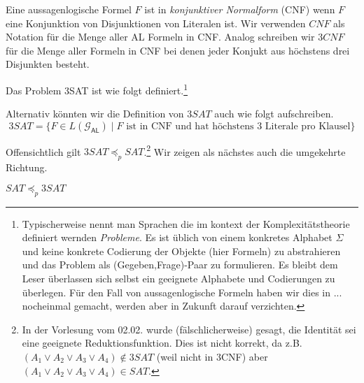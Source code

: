 Eine aussagenlogische Formel $F$ ist in \emph{konjunktiver Normalform} (CNF) wenn $F$ eine Konjunktion von Disjunktionen von Literalen ist.
Wir verwenden $CNF$ als Notation für die Menge aller AL Formeln in CNF.
Analog schreiben wir $3CNF$ für die Menge aller Formeln in CNF bei denen jeder Konjukt aus höchstens drei Disjunkten besteht.



\begin{Def}[name={[$3SAT$]}]
Das Problem 3SAT ist wie folgt definiert.\footnote{
Typischerweise nennt man Sprachen die im kontext der Komplexitätstheorie definiert wernden \emph{Probleme}.
Es ist üblich von einem konkretes Alphabet $\Sigma$ und keine konkrete Codierung der Objekte (hier Formeln) zu abstrahieren und das Problem als (Gegeben,Frage)-Paar zu formulieren.
Es bleibt dem Leser überlassen sich selbst ein geeignete Alphabete und Codierungen zu überlegen.
Für den Fall von aussagenlogische Formeln haben wir dies in ... nocheinmal gemacht, werden aber in Zukunft darauf verzichten. }
\begin{center}
\end{center}
	
\end{Def}
Alternativ könnten wir die Definition von $3SAT$ auch wie folgt aufschreiben.
$$3SAT = \{F\in L(\mathcal{G}_\mathsf{AL})\mid F \text{ ist in CNF und hat höchstens 3 Literale pro Klausel}\}$$

Offensichtlich gilt $3SAT \preceq_p SAT$.\footnote{
In der Vorlesung vom 02.02. wurde (fälschlicherweise) gesagt, die Identität sei eine geeignete Reduktionsfunktion.
Dies ist nicht korrekt, da z.B. 
$(A_1\lor A_2\lor A_3\lor A_4)\notin 3SAT$
(weil nicht in 3CNF) aber $(A_1\lor A_2\lor A_3\lor A_4)\in SAT$.
} Wir zeigen als nächstes auch die umgekehrte Richtung.

\begin{lemma}\label{lem:sat3sat}
	$SAT \preceq_p 3SAT$
\end{lemma}


